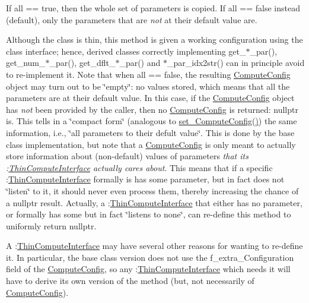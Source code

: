 If all == true, then the whole set of parameters is copied. If all == false instead (default), only the parameters that are {\itshape not} at their default value are.

Although the class is thin, this method is given a working configuration using the class interface; hence, derived classes correctly implementing get\+\_\+$\ast$\+\_\+par(), get\+\_\+num\+\_\+$\ast$\+\_\+par(), get\+\_\+dflt\+\_\+$\ast$\+\_\+par() and $\ast$\+\_\+par\+\_\+idx2str() can in principle avoid to re-\/implement it. Note that when all == false, the resulting \mbox{\hyperlink{class_s_m_spp__di__unipi__it_1_1_compute_config}{Compute\+Config}} object may turn out to be \char`\"{}empty\char`\"{}\+: no values stored, which means that all the parameters are at their default value. In this case, if the \mbox{\hyperlink{class_s_m_spp__di__unipi__it_1_1_compute_config}{Compute\+Config}} object has {\itshape not} been provided by the caller, then no \mbox{\hyperlink{class_s_m_spp__di__unipi__it_1_1_compute_config}{Compute\+Config}} is returned\+: nullptr is. This tells in a \char`\"{}compact form\char`\"{} (analogous to \mbox{\hyperlink{class_s_m_spp__di__unipi__it_1_1_f_real_objective_afca3d4682961381f16cb8e0b5b88e81e}{set\+\_\+\+Compute\+Config()}}) the same information, i.\+e., \char`\"{}all parameters to their defult value\char`\"{}. This is done by the base class implementation, but note that a \mbox{\hyperlink{class_s_m_spp__di__unipi__it_1_1_compute_config}{Compute\+Config}} is only meant to actually store information about (non-\/default) values of parameters {\itshape that its \+:\mbox{\hyperlink{class_s_m_spp__di__unipi__it_1_1_thin_compute_interface}{Thin\+Compute\+Interface}} actually cares about}. This means that if a specific \+:\mbox{\hyperlink{class_s_m_spp__di__unipi__it_1_1_thin_compute_interface}{Thin\+Compute\+Interface}} formally is has some parameter, but in fact does not \char`\"{}listen\char`\"{} to it, it should never even process them, thereby increasing the chance of a nullptr result. Actually, a \+:\mbox{\hyperlink{class_s_m_spp__di__unipi__it_1_1_thin_compute_interface}{Thin\+Compute\+Interface}} that either has no parameter, or formally has some but in fact \char`\"{}listens to none\char`\"{}, can re-\/define this method to uniformly return nullptr.

A \+:\mbox{\hyperlink{class_s_m_spp__di__unipi__it_1_1_thin_compute_interface}{Thin\+Compute\+Interface}} may have several other reasons for wanting to re-\/define it. In particular, the base class version does not use the f\+\_\+extra\+\_\+\+Configuration field of the \mbox{\hyperlink{class_s_m_spp__di__unipi__it_1_1_compute_config}{Compute\+Config}}, so any \+:\mbox{\hyperlink{class_s_m_spp__di__unipi__it_1_1_thin_compute_interface}{Thin\+Compute\+Interface}} which needs it will have to derive its own version of the method (but, not necessarily of \mbox{\hyperlink{class_s_m_spp__di__unipi__it_1_1_compute_config}{Compute\+Config}}). 

